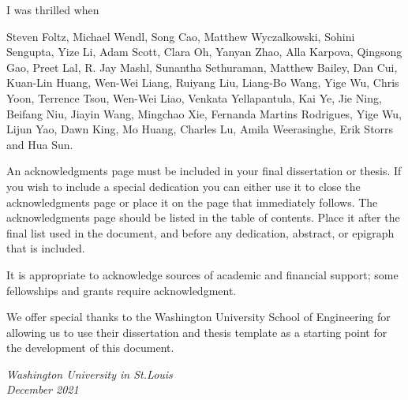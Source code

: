 \thesisacknowledgments

I was thrilled when

Steven Foltz, Michael Wendl, Song Cao, Matthew Wyczalkowski, Sohini Sengupta, Yize Li, Adam Scott, Clara Oh, Yanyan Zhao, Alla Karpova, Qingsong Gao, Preet Lal, R. Jay Mashl, Sunantha Sethuraman, Matthew Bailey, Dan Cui, Kuan-Lin Huang, Wen-Wei Liang, Ruiyang Liu, Liang-Bo Wang, Yige Wu, Chris Yoon, Terrence Tsou, Wen-Wei Liao, Venkata Yellapantula, Kai Ye, Jie Ning, Beifang Niu, Jiayin Wang, Mingchao Xie, Fernanda Martins Rodrigues, Yige Wu, Lijun Yao, Dawn King, Mo Huang, Charles Lu, Amila Weerasinghe, Erik Storrs and Hua Sun.

An acknowledgments page must be included in your final dissertation or thesis.  If you wish to
include a special dedication you can either use it to close the acknowledgments page or place it on
the page that immediately follows.  The acknowledgments page should be listed in the table of
contents.  Place it after the final list used in the document, and before any dedication, abstract,
or epigraph that is included.

It is appropriate to acknowledge sources of academic and financial support; some fellowships and
grants require acknowledgment.

We offer special thanks to the Washington University School of Engineering for allowing us to use
their dissertation and thesis template as a starting point for the development of this document.

\null\hfill \thesisauthor

\noindent
\textit{Washington University in St.\@ Louis}\\
\textit{December 2021}
